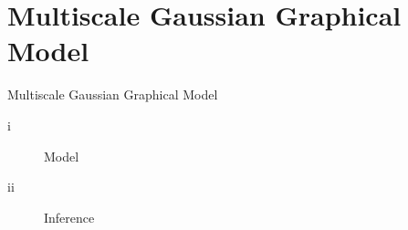 \documentclass[11pt]{beamer}
\newcommand{\edgeunit}{1.5}
\newcommand{\emphase}[1]{\textcolor{Complement}{#1}}
\newcommand{\prune}[1]{\textcolor{Framaprunelight}{#1}}
\begin{document}

%	



\section{Multiscale Gaussian Graphical Model}
\begin{frame}{}
\begin{center}
	\Huge{\prune{Multiscale Gaussian Graphical Model}}
\end{center}
\begin{center}
	\begin{description}
		\item[i] Model
		\item[ii] Inference
	\end{description}
\end{center}
\end{frame}
\end{document}
